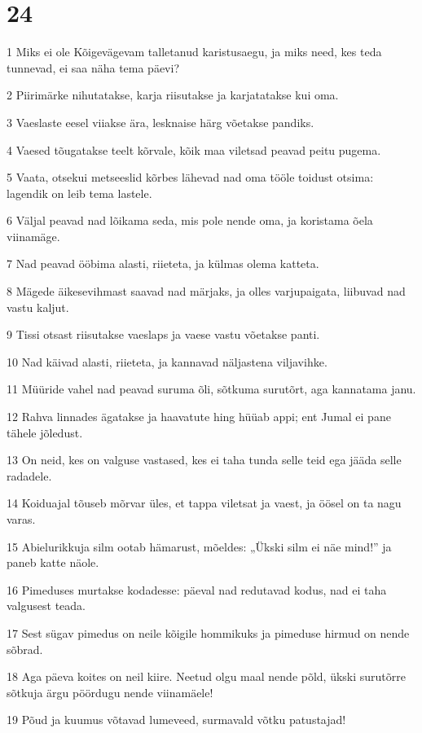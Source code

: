 \chapter{24}

\par 1 Miks ei ole Kõigevägevam talletanud karistusaegu, ja miks need, kes teda tunnevad, ei saa näha tema päevi?
\par 2 Piirimärke nihutatakse, karja riisutakse ja karjatatakse kui oma.
\par 3 Vaeslaste eesel viiakse ära, lesknaise härg võetakse pandiks.
\par 4 Vaesed tõugatakse teelt kõrvale, kõik maa viletsad peavad peitu pugema.
\par 5 Vaata, otsekui metseeslid kõrbes lähevad nad oma tööle toidust otsima: lagendik on leib tema lastele.
\par 6 Väljal peavad nad lõikama seda, mis pole nende oma, ja koristama õela viinamäge.
\par 7 Nad peavad ööbima alasti, riieteta, ja külmas olema katteta.
\par 8 Mägede äikesevihmast saavad nad märjaks, ja olles varjupaigata, liibuvad nad vastu kaljut.
\par 9 Tissi otsast riisutakse vaeslaps ja vaese vastu võetakse panti.
\par 10 Nad käivad alasti, riieteta, ja kannavad näljastena viljavihke.
\par 11 Müüride vahel nad peavad suruma õli, sõtkuma surutõrt, aga kannatama janu.
\par 12 Rahva linnades ägatakse ja haavatute hing hüüab appi; ent Jumal ei pane tähele jõledust.
\par 13 On neid, kes on valguse vastased, kes ei taha tunda selle teid ega jääda selle radadele.
\par 14 Koiduajal tõuseb mõrvar üles, et tappa viletsat ja vaest, ja öösel on ta nagu varas.
\par 15 Abielurikkuja silm ootab hämarust, mõeldes: „Ükski silm ei näe mind!” ja paneb katte näole.
\par 16 Pimeduses murtakse kodadesse: päeval nad redutavad kodus, nad ei taha valgusest teada.
\par 17 Sest sügav pimedus on neile kõigile hommikuks ja pimeduse hirmud on nende sõbrad.
\par 18 Aga päeva koites on neil kiire. Neetud olgu maal nende põld, ükski surutõrre sõtkuja ärgu pöördugu nende viinamäele!
\par 19 Põud ja kuumus võtavad lumeveed, surmavald võtku patustajad!
